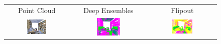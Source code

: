     \begin{figure}[h!]
        \centering
        \begin{tabular}{ccc}
            Point Cloud & Deep Ensembles & Flipout \\
            \includegraphics[width=0.33\textwidth, height=0.18\textheight]{images/seg_output/s3dis_DE/S3DIS_1_RGB.pdf} &
            \includegraphics[width=0.33\textwidth, height=0.18\textheight]{images/seg_output/s3dis_DE/S3DIS_1_Pred.pdf} &
            \includegraphics[width=0.33\textwidth, height=0.18\textheight]{images/seg_output/s3dis_DE/office_3.pdf} \\


\end{tabular}
\end{figure}
